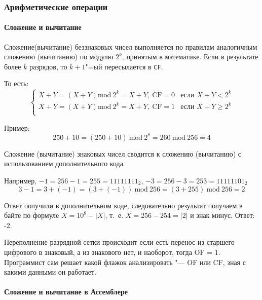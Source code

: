 \subsubsection{Арифметические операции}

\paragraph{Сложение и вычитание}
Сложение(вычитание) беззнаковых чисел выполняется по правилам аналогичным сложению (вычитанию)
по модулю $2^k$, принятым в математике. Если в результате более $k$ разрядов, то $k+1$"=ый пересылается
в \verb|CF|.

То есть:
\begin{equation*}
    \begin{cases}
        X + Y = (X + Y) \text{mod} ~2^k = X + Y, ~\text{CF} = 0 & \text{если $X + Y < 2^k$} \\
        X + Y = (X + Y) \text{mod} ~2^k = X + Y, ~\text{CF} = 1 & \text{если $X + Y \ge 2^k$} \\

    \end{cases}    
\end{equation*}

Пример:
\begin{equation*}
    250 + 10 = (250 + 10) ~\text{mod}~ 2^8 = 260~ \text{mod} ~256 = 4
\end{equation*}

Сложение (вычитание) знаковых чисел сводится к сложению (вычитанию) с использованием дополнительного кода.

Например, $-1 = 256 - 1 = 255 = {11111111}_2$, $-3 = 256 - 3 = 253 = {11111101}_2$
\begin{equation*}
    3 - 1 = 3 + (-1) = (3 + (-1))~\text{mod}~256 = (3 + 255)~ \text{mod}~256 = 2
\end{equation*}

Ответ получили в дополнительном коде, следовательно результат получаем  в байте по формуле $X = 10^8 - |X|$, т.~е.
$X = 256 - 254 = |2|$ и знак минус. Ответ: -2.

Переполнение разрядной сетки происходит если есть перенос из старшего цифрового в знаковый, а из знакового нет, и
наоборот, тогда OF = 1. Программист сам решает какой флажок анализировать "--- OF или CF, зная 
с какими данными он работает.

\paragraph{Сложение и вычитание в Ассемблере}

